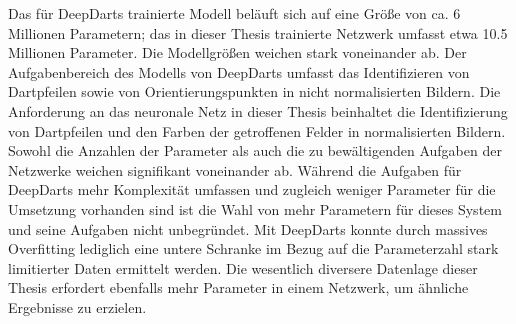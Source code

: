 Das für DeepDarts trainierte Modell beläuft sich auf eine Größe von ca. 6 Millionen Parametern; das in dieser Thesis trainierte Netzwerk umfasst etwa 10.5 Millionen Parameter. Die Modellgrößen weichen stark voneinander ab. Der Aufgabenbereich des Modells von DeepDarts umfasst das Identifizieren von Dartpfeilen sowie von Orientierungspunkten in nicht normalisierten Bildern. Die Anforderung an das neuronale Netz in dieser Thesis beinhaltet die Identifizierung von Dartpfeilen und den Farben der getroffenen Felder in normalisierten Bildern. Sowohl die Anzahlen der Parameter als auch die zu bewältigenden Aufgaben der Netzwerke weichen signifikant voneinander ab. Während die Aufgaben für DeepDarts mehr Komplexität umfassen und zugleich weniger Parameter für die Umsetzung vorhanden sind ist die Wahl von mehr Parametern für dieses System und seine Aufgaben nicht unbegründet. Mit DeepDarts konnte durch massives Overfitting lediglich eine untere Schranke im Bezug auf die Parameterzahl stark limitierter Daten ermittelt werden. Die wesentlich diversere Datenlage dieser Thesis erfordert ebenfalls mehr Parameter in einem Netzwerk, um ähnliche Ergebnisse zu erzielen.


